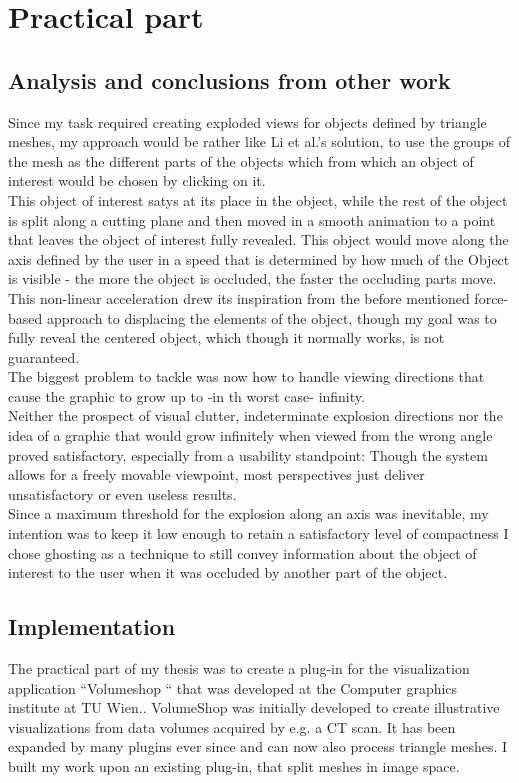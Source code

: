\chapter{Practical part}
\section{Analysis and conclusions from other work}
Since my task required creating exploded views for objects defined by triangle meshes, my approach would be rather like Li et al.'s solution, to use the groups of the mesh as the different parts of the objects which from which an object of interest would be chosen by clicking on it.\\ 
This object of interest satys at its place in the object, while the rest of the object is split along a cutting plane and then moved in a smooth animation to a point that leaves the object of interest fully revealed. This object would move along the axis defined by the user in a speed that is determined by how much of the Object is visible - the more the object is occluded, the faster the occluding parts move. This non-linear acceleration drew its inspiration from the before mentioned force-based approach to displacing the elements of the object, though my goal was to fully reveal the centered object, which though it normally works, is not guaranteed.\\
The biggest problem to tackle was now how to handle viewing directions that cause the graphic to grow up to -in th worst case- infinity.\\
Neither the prospect of visual clutter, indeterminate explosion directions nor the idea of a graphic that would grow infinitely when viewed from the wrong angle proved satisfactory, especially from a usability standpoint: Though the system allows for a freely movable viewpoint, most perspectives just deliver unsatisfactory or even useless results.\\
Since a maximum threshold for the explosion along an axis was inevitable, my intention was to keep it low enough to retain a satisfactory level of compactness I chose ghosting as a technique to still convey information about the object of interest to the user when it was occluded by another part of the object.\\
\section{Implementation}
The practical part of my thesis was to create a plug-in for the visualization application ``Volumeshop `` that was developed at the Computer graphics institute at TU Wien.\cite{bruckner-2005-VIS}. VolumeShop was initially developed to create illustrative visualizations from data volumes acquired by e.g. a CT scan. It has been expanded by many plugins ever since and can now also process triangle meshes. I built my work upon an existing plug-in\cite{schwankl-2013-smis}, that split meshes in image space.
